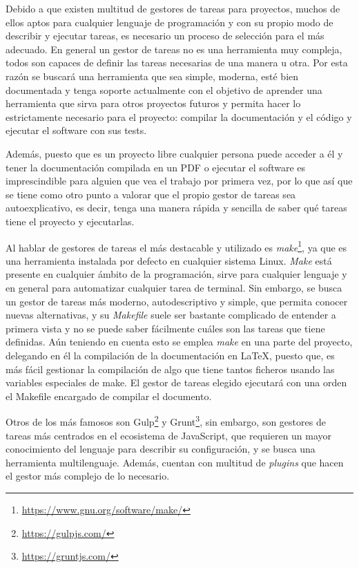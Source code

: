 Debido a que existen multitud de gestores de tareas para proyectos, muchos de
ellos aptos para cualquier lenguaje de programación y con su propio modo de
describir y ejecutar tareas, es necesario un proceso de selección para el más
adecuado. En general un gestor de tareas no es una herramienta muy compleja,
todos son capaces de definir las tareas necesarias de una manera u otra. Por
esta razón se buscará una herramienta que sea simple, moderna, esté bien
documentada y tenga soporte actualmente con el objetivo de aprender una
herramienta que sirva para otros proyectos futuros y permita hacer lo
estrictamente necesario para el proyecto: compilar la documentación y el código
y ejecutar el software con sus tests. 

Además, puesto que es un proyecto libre cualquier persona puede acceder a él y
tener la documentación compilada en un PDF o ejecutar el software es
imprescindible para alguien que vea el trabajo por primera vez, por lo que así
que se tiene como otro punto a valorar que el propio gestor de tareas sea
autoexplicativo, es decir, tenga una manera rápida y sencilla de saber qué
tareas tiene el proyecto y ejecutarlas.

Al hablar de gestores de tareas el más destacable y utilizado es
\textit{make}\footnote{\url{https://www.gnu.org/software/make/}}, ya que es una
herramienta instalada por defecto en cualquier sistema Linux. \textit{Make} está
presente en cualquier ámbito de la programación, sirve para cualquier lenguaje y
en general para automatizar cualquier tarea de terminal. Sin embargo, se busca
un gestor de tareas más moderno, autodescriptivo y simple, que permita conocer
nuevas alternativas, y su \textit{Makefile} suele ser bastante complicado de
entender a primera vista y no se puede saber fácilmente cuáles son las tareas
que tiene definidas. Aún teniendo en cuenta esto se emplea \textit{make} en una
parte del proyecto, delegando en él la compilación de la documentación en LaTeX,
puesto que, es más fácil gestionar la compilación de algo que tiene tantos
ficheros usando las variables especiales de make. El gestor de tareas elegido
ejecutará con una orden el Makefile encargado de compilar el documento.

Otros de los más famosos son Gulp\footnote{\url{https://gulpjs.com/}} y
Grunt\footnote{\url{https://gruntjs.com/}}, sin embargo, son gestores de tareas
más centrados en el ecosistema de JavaScript, que requieren un mayor
conocimiento del lenguaje para describir su configuración, y se busca una
herramienta multilenguaje. Además, cuentan con multitud de \textit{plugins} que
hacen el gestor más complejo de lo necesario.

